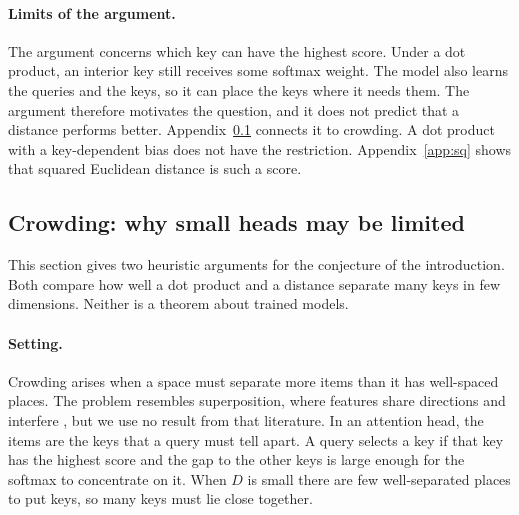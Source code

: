 \documentclass[11pt]{article}
\begin{document}
\paragraph{Limits of the argument.}
The argument concerns which key can have the highest score.
Under a dot product, an interior key still receives some softmax weight.
The model also learns the queries and the keys, so it can place the keys where it needs them.
The argument therefore motivates the question, and it does not predict that a distance performs better.
Appendix~\ref{app:super} connects it to crowding.
A dot product with a key-dependent bias does not have the restriction.
Appendix~\ref{app:sq} shows that squared Euclidean distance is such a score.

\subsection{Crowding: why small heads may be limited}\label{app:super}

This section gives two heuristic arguments for the conjecture of the introduction.
Both compare how well a dot product and a distance separate many keys in few dimensions.
Neither is a theorem about trained models.

\paragraph{Setting.}
Crowding arises when a space must separate more items than it has well-spaced places.
The problem resembles superposition, where features share directions and interfere \citep{elhage2022}, but we use no result from that literature.
In an attention head, the items are the keys that a query must tell apart.
A query selects a key if that key has the highest score and the gap to the other keys is large enough for the softmax to concentrate on it.
When $D$ is small there are few well-separated places to put keys, so many keys must lie close together.
\end{document}
